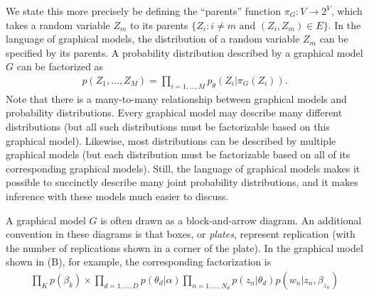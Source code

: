 We state this more precisely be defining the ``parents'' function
$\pi_G : V \rightarrow 2^V$, which takes a random variable $Z_m$ to
its parents $\{ Z_i : i \neq m \mbox{ and } (Z_i, Z_m) \in E \}$.  In
the language of graphical models, the distribution of a random
variable $Z_m$ can be specified by its parents. A probability
distribution described by a graphical model $G$ can be factorized as
\begin{align}
  p(Z_1, \ldots, Z_M) = \prod_{i=1, \ldots, M} p_\theta(Z_i | \pi_G(Z_i) ).
\end{align}
Note that there is a many-to-many relationship between graphical
models and probability distributions. Every graphical model may
describe many different distributions (but all such distributions must
be factorizable based on this graphical model).  Likewise, most
distributions can be described by multiple graphical models (but each
distribution must be factorizable based on all of its corresponding
graphical models). Still, the language of graphical models makes it
possible to succinctly describe many joint probability distributions,
and it makes inference with these models much easier to discuss.

A graphical model $G$ is often drawn as a block-and-arrow diagram.  An
additional convention in these diagrams is that boxes, or
\emph{plates}, represent replication (with the number of replications
shown in a corner of the plate). In the graphical model shown in
 (B), for example, the corresponding factorization is
\begin{align}
  \prod_K p(\beta_k) \times \prod_{d=1,\ldots,D} p(\theta_d | \alpha) \prod_{n=1,\ldots,N_d} p(z_n | \theta_d) p(w_n | z_n, \beta_{z_n})
\end{align}

